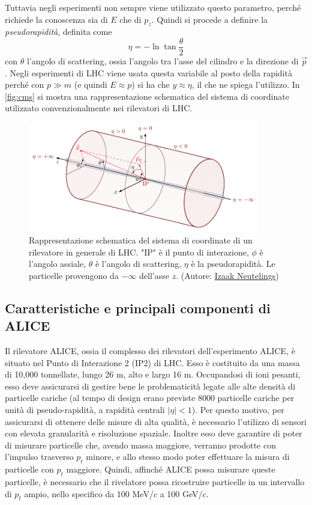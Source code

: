 Tuttavia negli esperimenti non sempre viene utilizzato questo parametro, perché richiede la conoscenza sia di $E$ che di $p_z$.
Quindi si procede a definire la \emph{pseudorapidità}, definita come 
\begin{equation}
    \eta = -\ln\tan\dfrac\theta2
\end{equation}
con $\theta$ l'angolo di scattering, ossia l'angolo tra l'asse del cilindro e la direzione di $\vec p$.
Negli esperimenti di LHC viene usata questa variabile al posto della rapidità perché con $p\gg m$ (e quindi $E\approx p$) si ha che $y\approx \eta$, il che ne spiega l'utilizzo.
In \autoref{fig:cms} si mostra una rappresentazione schematica del sistema di coordinate utilizzato convenzionalmente nei rilevatori di LHC.

\begin{figure}[htb]
    \centering
    \includegraphics[width=0.9\textwidth]{image/1-alice/axis3D_CMS.pdf}
    \caption{Rappresentazione schematica del sistema di coordinate di un rilevatore in generale di LHC. "IP" è il punto di interazione, $\phi$ è l'angolo assiale, $\theta$ è l'angolo di scattering, $\eta$ è la pseudorapidità. Le particelle provengono da $-\infty$ dell'asse $z$. (Autore: \href{https://tikz.net/axis3d_cms/}{Izaak Neutelings})}
    \label{fig:cms}
\end{figure}

\subsection{Caratteristiche e principali componenti di ALICE}
Il rilevatore ALICE, ossia il complesso dei rilevatori dell'esperimento ALICE, è situato nel Punto di Interazione 2 (IP2) di LHC.
Esso è costituito da una massa di 10,000 tonnellate, lungo 26 m, alto e largo 16 m.
Occupandosi di ioni pesanti, esso deve assicurarsi di gestire bene le problematicità legate alle alte densità di particelle cariche (al tempo di design erano previste 8000 particelle cariche per unità di pseudo-rapidità, a rapidità centrali $|\eta|<1$).
Per questo motivo, per assicurarsi di ottenere delle misure di alta qualità, è necessario l'utilizzo di sensori con elevata granularità e risoluzione spaziale. 
Inoltre esso deve garantire di poter di misurare particelle che, avendo massa maggiore, verranno prodotte con l'impulso trasverso $p_t$ minore, e allo stesso modo poter effettuare la misura di particelle con $p_t$ maggiore.
Quindi, affinché ALICE possa misurare queste particelle, è necessario che il rivelatore possa ricostruire particelle in un intervallo di $p_t$ ampio, nello specifico da 100 MeV/$c$ a 100 GeV/$c$.

